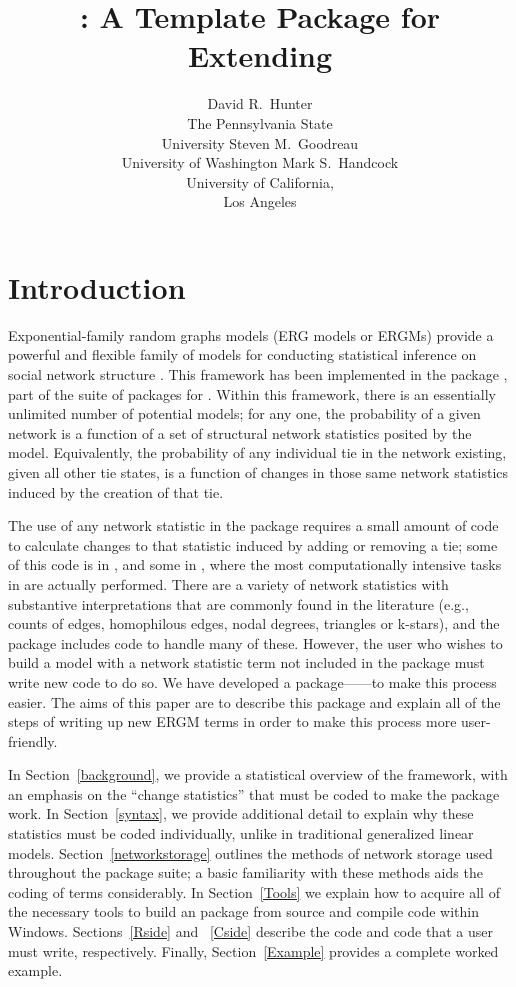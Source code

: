\documentclass[nojss]{jss}
\title{\pkg{ergm.userterms}: A Template Package for Extending 
\pkg{statnet}}
\author{
  David R.\ Hunter \\ The Pennsylvania State\\University \And
  Steven M.\ Goodreau \\ University of Washington \And
  Mark S.\ Handcock \\ University of California,\\Los Angeles
}
\begin{document}
\section{Introduction}
\label{introduction}

Exponential-family random graphs models (ERG models or ERGMs) provide a
powerful and flexible family of models for conducting statistical inference on
social network structure \citep{fra86, statnetjss,ergmjss, statnettutorialjss}.
This framework has been implemented in the  package \citep{ergmjss},
part of the  suite of packages \citep{statnetjss} for 
\citep{r2010}. Within this framework, there is an essentially unlimited number
of potential models; for any one, the probability of a given network is a
function of a set of structural network statistics posited by the model.
Equivalently, the probability of any individual tie in the network existing,
given all other tie states, is a function of changes in those same network
statistics induced by the creation of that tie.

The use of any network statistic in the  package requires a small
amount of code to calculate changes to that statistic induced by adding or
removing a tie; some of this code is in , and some in ,
where the most computationally intensive tasks in  are actually
performed. There are a variety of network statistics with substantive
interpretations that are commonly found in the literature (e.g., counts of edges,
homophilous edges, nodal degrees, triangles or k-stars), and the 
package includes code to handle many of these. However, the user who wishes to
build a model with a network statistic term not included in the  package 
must write new code to do so. We have developed a 
package------to make this process easier. 
The aims of this paper are
to describe this package and explain all of the steps of writing up new ERGM
terms in order to make this process more user-friendly.

In Section~\ref{background}, we provide a statistical overview of the 
framework, with an emphasis on the ``change statistics'' that must be coded to
make the  package work. In Section~\ref{syntax}, we provide additional
detail to explain why these statistics must be coded individually, unlike in
traditional generalized linear models. Section~\ref{networkstorage} outlines the
methods of network storage used throughout the  package suite; a
basic familiarity with these methods aids the coding of  terms
considerably. In Section~\ref{Tools} we explain how to acquire all of the
necessary tools to build an  package from source and compile
 code within Windows. Sections~\ref{Rside} and ~\ref{Cside} describe
the  code and  code that a user must write,
respectively. Finally, Section~\ref{Example} provides a complete worked example.
\end{document}
